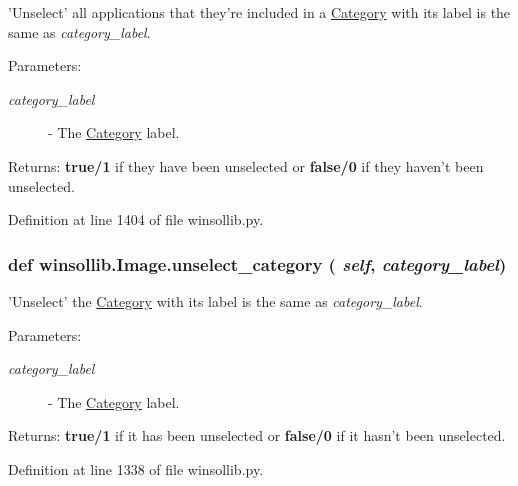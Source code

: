 'Unselect' all applications that they're included in a \hyperlink{classwinsollib_1_1Category}{Category} with its label is the same as {\em category\_\-label\/}. 

\begin{Desc}
\item[Parameters:]
\begin{description}
\item[{\em category\_\-label}]- The \hyperlink{classwinsollib_1_1Category}{Category} label. \end{description}
\end{Desc}
\begin{Desc}
\item[Returns:]{\bf true/1} if they have been unselected or {\bf false/0} if they haven't been unselected. \end{Desc}


Definition at line 1404 of file winsollib.py.\hypertarget{classwinsollib_1_1Image_deae22f4a49d9bde6025459b46a49b4c}{
\subsubsection[unselect\_\-category]{\setlength{\rightskip}{0pt plus 5cm}def winsollib.Image.unselect\_\-category ( {\em self},  {\em category\_\-label})}}
\label{classwinsollib_1_1Image_deae22f4a49d9bde6025459b46a49b4c}


'Unselect' the \hyperlink{classwinsollib_1_1Category}{Category} with its label is the same as {\em category\_\-label\/}. 

\begin{Desc}
\item[Parameters:]
\begin{description}
\item[{\em category\_\-label}]- The \hyperlink{classwinsollib_1_1Category}{Category} label. \end{description}
\end{Desc}
\begin{Desc}
\item[Returns:]{\bf true/1} if it has been unselected or {\bf false/0} if it hasn't been unselected. \end{Desc}


Definition at line 1338 of file winsollib.py.

